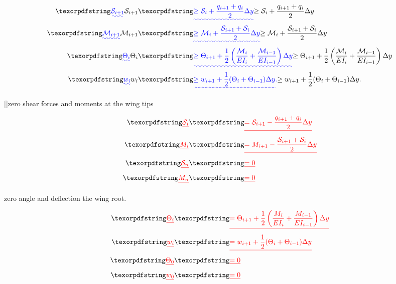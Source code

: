 \begin{align}
    \DIFadd{\label{e:sheargp}
    \mathcal{S}_{i+1} }&\DIFadd{\geq \mathcal{S}_i + \frac{q_{i+1} + q_i}{2} \Delta y }\\
    \DIFadd{\label{e:momentgp}
    \mathcal{M}_{i+1} }&\DIFadd{\geq \mathcal{M}_i + \frac{\mathcal{S}_{i+1} + \mathcal{S}_i}{2} \Delta y }\\
    \DIFadd{\label{e:anglegp}
    \Theta_{i} }&\DIFadd{\geq \Theta_{i+1} + \frac{1}{2} \left(\frac{\mathcal{M}_i}{EI_i} + \frac{\mathcal{M}_{i-1}}{EI_{i-1}} \right) \Delta y }\\
    \DIFadd{\label{e:deflection}
    w_{i} }&\DIFadd{\geq w_{i+1} + \frac{1}{2} (\Theta_i + \Theta_{i-1}) \Delta y .
}\end{align}

[]\DIFaddend zero shear forces and moments at the wing tips \DIFdelbegin {}%

\begin{eqnarray*}
    \DIFdel{\label{e:shear}
    \mathcal{S}_i }&\DIFdel{= \mathcal{S}_{i+1} - \frac{q_{i+1} + q_i}{2}\Delta y }\\
    \DIFdel{\label{e:moment}
    M_i }&\DIFdel{= M_{i+1} - \frac{\mathcal{S}_{i+1} + \mathcal{S}_i}{2}\Delta y }\\
    \DIFdel{\label{e:shearboundary}
    \mathcal{S}_n }&\DIFdel{= 0 }\\
    \DIFdel{\label{e:momentboundary}
    M_n }&\DIFdel{= 0
}\end{eqnarray*}

\DIFdelend \DIFaddbegin {}\DIFaddend zero angle and deflection \DIFdelbegin {}\DIFdelend \DIFaddbegin {}\DIFaddend the wing root.\cite{bending} \DIFaddbegin \\
\DIFaddend 

\DIFdelbegin \begin{eqnarray*}
    \DIFdel{\label{e:angle}
    \Theta_{i} }&\DIFdel{= \Theta_{i+1} + \frac{1}{2} \left(\frac{M_i}{EI_i} + \frac{M_{i-1}}{EI_{i-1}} \right) \Delta y }\\
    \DIFdel{\label{e:deflection}
    w_{i} }&\DIFdel{= w_{i+1} + \frac{1}{2} (\Theta_i + \Theta_{i-1}) \Delta y }\\
    \DIFdel{\label{e:angleboundary}
    \Theta_0 }&\DIFdel{= 0 }\\
    \DIFdel{\label{e:defboundary}
    w_0 }&\DIFdel{= 0 
}\end{eqnarray*}
\DIFdelend \DIFaddbegin \textbf{} \\
\DIFaddend 

